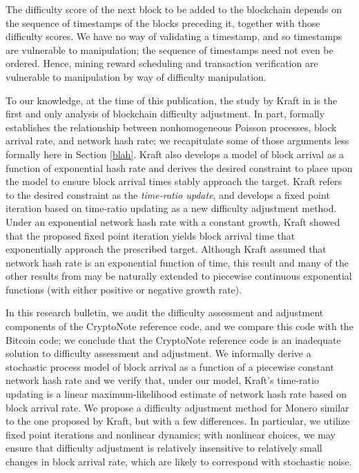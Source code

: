 \documentclass[12pt,english]{mrl}
\theoremstyle{definition}
\numberwithin{equation}{section}
\numberwithin{figure}{section}
\numberwithin{equation}{section}
\numberwithin{equation}{section}
\numberwithin{figure}{section}
\begin{document}
The difficulty score of the next block to be added to the blockchain depends on the sequence of timestamps of the blocks preceding it, together with those difficulty scores.  We have no way of validating a timestamp, and so timestamps are vulnerable to manipulation; the sequence of timestamps need not even be ordered. Hence, mining reward scheduling and transaction verification are vulnerable to manipulation by way of difficulty manipulation.  

To our knowledge, at the time of this publication, the study by Kraft in \cite{kraft2015difficulty} is the first and only analysis of blockchain difficulty adjustment. In part, \cite{kraft2015difficulty} formally establishes the relationship between nonhomogeneous Poisson processes, block arrival rate, and network hash rate; we recapitulate some of those arguments less formally here in Section \ref{blah}.  Kraft also develops a model of block arrival as a function of exponential hash rate and derives the desired constraint to place upon the model to ensure block arrival times stably approach the target. Kraft refers to the desired constraint as the \textit{time-ratio update}, and develops a fixed point iteration based on time-ratio updating as a new difficulty adjustment method. Under an exponential network hash rate with a constant growth, Kraft showed that the proposed fixed point iteration yields block arrival time that exponentially approach the prescribed target. Although Kraft assumed that network hash rate is an exponential function of time, this result and many of the other results from \cite{kraft2015difficulty} may be naturally extended to piecewise continuous exponential functions (with either positive or negative growth rate).

In this research bulletin, we audit the difficulty assessment and adjustment components of the CryptoNote reference code, and we compare this code with the Bitcoin code; we conclude that the CryptoNote reference code is an inadequate solution to difficulty assessment and adjustment. We informally derive a stochastic process model of block arrival as a function of a piecewise constant network hash rate and we verify that, under our model, Kraft's time-ratio updating is a linear maximum-likelihood estimate of network hash rate based on block arrival rate. We propose a difficulty adjustment method for Monero similar to the one proposed by Kraft, but with a few differences. In particular, we utilize fixed point iterations and nonlinear dynamics; with nonlinear choices, we may ensure that difficulty adjustment is relatively insensitive to relatively small changes in block arrival rate, which are likely to correspond with stochastic noise.  
\end{document}
